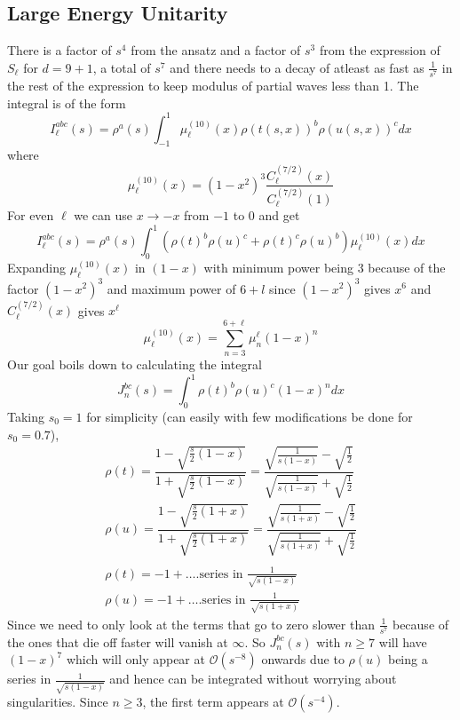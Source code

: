 ﻿\documentclass[12pt,a4paper]{article}
\begin{document}
\subsection{Large Energy Unitarity}
There is a factor of $s^{4}$ from the ansatz and a factor of $s^{3}$ from the expression of $S_{\ell}$ for $d=9+1$, a total of $s^{7}$ and there needs to a decay of atleast as fast as $\frac{1}{s^{7}}$ in the rest of the expression to keep modulus of partial waves less than 1. The integral is of the form 
$$
I_{\ell}^{a b c}(s)=\rho^{a}(s) \int_{-1}^{1} \mu_{\ell}^{(10)}(x) \rho(t(s, x))^{b} \rho(u(s, x))^{c} d x
$$
where
$$
\mu_{\ell}^{(10)}(x)=\left(1-x^{2}\right)^{3} \frac{C_{\ell}^{(7 / 2)}(x)}{C_{\ell}^{(7 / 2)}(1)}
$$
For even $\ell$ we can use $x \rightarrow -x$ from $-1$ to $0$ and get
$$
I_{\ell}^{a b c}(s)=\rho^{a}(s) \int_{0}^{1}\left(\rho(t)^{b} \rho(u)^{c}+\rho(t)^{c} \rho(u)^{b}\right) \mu_{\ell}^{(10)}(x) d x
$$
Expanding $\mu_{\ell}^{(10)}(x)$ in $(1-x)$ with minimum power being $3$ because of the factor $(1-x^{2})^{3}$ and maximum power of $6+l$ since $(1-x^{2})^{3}$ gives $x^{6}$ and $C_{\ell}^{(7 / 2)}(x)$ gives $x^{\ell}$
$$
\mu_{\ell}^{(10)}(x)=\sum_{n=3}^{6+\ell} \mu_{n}^{\ell}(1-x)^{n}
$$
Our goal boils down to calculating the integral
$$
J_{n}^{b c}(s)=\int_{0}^{1} \rho(t)^{b} \rho(u)^{c}(1-x)^{n} d x
$$
Taking $s_{0}=1$ for simplicity (can easily with few modifications be done for $s_{0}=0.7$),
$$
\begin{array}{l}
\rho(t)=\dfrac{1-\sqrt{\frac{s}{2}(1-x)}}{1+\sqrt{\frac{s}{2}(1-x)}} = \dfrac{\sqrt{\frac{1}{s(1-x)}}-\sqrt{\frac{1}{2}}}{\sqrt{\frac{1}{s(1-x)}}+\sqrt{\frac{1}{2}}}\\
\rho(u)=\dfrac{1-\sqrt{\frac{s}{2}(1+x)}}{1+\sqrt{\frac{s}{2}(1+x)}} = \dfrac{\sqrt{\frac{1}{s(1+x)}}-\sqrt{\frac{1}{2}}}{\sqrt{\frac{1}{s(1+x)}}+\sqrt{\frac{1}{2}}} \\\\
\rho(t)=-1+\ldots .\text{series in }\frac{1}{\sqrt{s(1-x)}}\\
\rho(u)=-1+\ldots .\text{series in }\frac{1}{\sqrt{s(1+x)}}
\end{array}
$$
Since we need to only look at the terms that go to zero slower than $\frac{1}{s^{7}}$ because of the ones that die off faster will vanish at $\infty$. So $J_{n}^{b c}(s)$ with $n\geq 7$ will have $(1-x)^{7}$ which will only appear at $\mathcal{O}(s^{-8})$ onwards due to $\rho(u)$ being a series in $\frac{1}{\sqrt{s(1-x)}}$ and hence can be integrated without worrying about singularities. Since $n\geq 3$, the first term appears at $\mathcal{O}(s^{-4})$.\\\\
\end{document}
